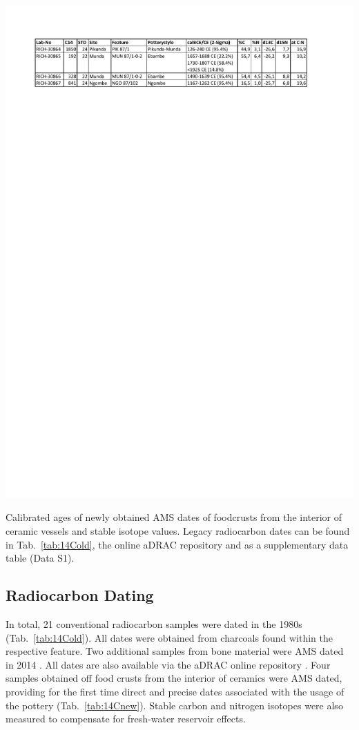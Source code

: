 \documentclass[smallextended,natbib]{svjour3}       %
\begin{document}
\begin{table}[p]
	\centering
	\includegraphics[width=.9\textwidth]{Tab_New14C.pdf}
	\caption{Calibrated ages \citep{Reimer.2020} of newly obtained AMS dates of foodcrusts from the interior of ceramic vessels and stable isotope values. Legacy radiocarbon dates can be found in Tab.~\ref{tab:14Cold}, the online aDRAC repository \citep{Seidensticker.2021f} and as a supplementary data table (Data S1).}
	\label{tab:14Cnew}	
\end{table}

\subsection*{Radiocarbon Dating}

In total, 21 conventional radiocarbon samples were dated in the 1980s (Tab.~\ref{tab:14Cold}). All dates were obtained from charcoals found within the respective feature. Two additional samples from bone material were AMS dated in 2014 \citep[355--356 Appendix 2]{Seidensticker.2021e}. All dates are also available via the aDRAC online repository \citep[\url{https://github.com/dirkseidensticker/aDRAC};][]{Seidensticker.2021f}. Four samples obtained off food crusts from the interior of ceramics were AMS dated, providing for the first time direct and precise dates associated with the usage of the pottery (Tab.~\ref{tab:14Cnew}). Stable carbon and nitrogen isotopes were also measured to compensate for fresh-water reservoir effects.
\end{document}
